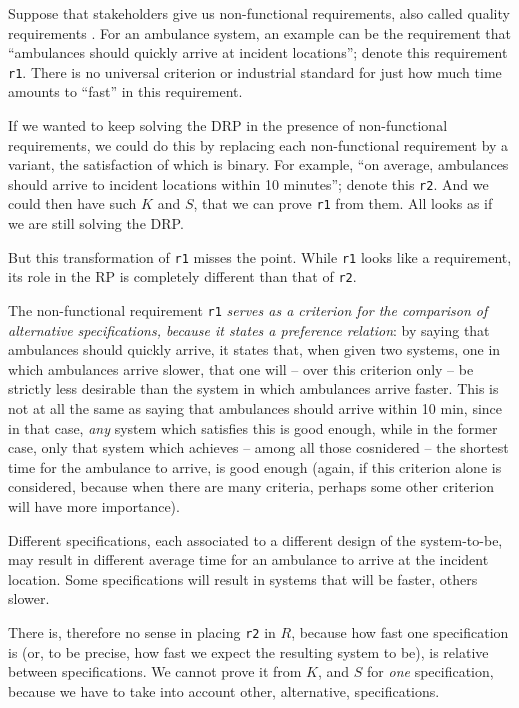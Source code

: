 \documentclass[graybox]{svmult}
\newcommand{\zi}[1]{\textit{#1}}
\newcommand{\xt}[1]{\texttt{#1}}
\newcommand{\req}[1]{\xt{#1}}
\newcommand{\RP}{RP}
\newcommand{\ZJRP}{DRP}
\begin{document}
Suppose that stakeholders give us non-functional requirements, also called quality requirements \cite{boehm1976quantitative, mylopoulos1992representing}. For an ambulance system, an example can be the requirement that ``ambulances should quickly arrive at incident locations''; denote this requirement \req{r1}. There is no universal criterion or industrial standard for just how much time amounts to ``fast'' in this requirement. 

If we wanted to keep solving the \ZJRP{} in the presence of non-functional requirements, we could do this by replacing each non-functional requirement by a variant, the satisfaction of which is binary. For example, ``on average, ambulances should arrive to incident locations within 10 minutes''; denote this \req{r2}. And we could then have such $K$ and $S$, that we can prove \req{r1} from them. All looks as if we are still solving the \ZJRP. 

But this transformation of \req{r1} misses the point. While \req{r1} looks like a requirement, its role in the \RP{} is completely different than that of \req{r2}. 

The non-functional requirement \req{r1} \zi{serves as a criterion for the comparison of alternative specifications, because it states a preference relation}: by saying that ambulances should quickly arrive, it states that, when given two systems, one in which ambulances arrive slower, that one will -- over this criterion only -- be strictly less desirable than the system in which ambulances arrive faster. This is not at all the same as saying that ambulances should arrive within 10 min, since in that case, \zi{any} system which satisfies this is good enough, while in the former case, only that system which achieves -- among all those cosnidered -- the shortest time for the ambulance to arrive, is good enough (again, if this criterion alone is considered, because when there are many criteria, perhaps some other criterion will have more importance).

Different specifications, each associated to a different design of the system-to-be, may result in different average time for an ambulance to arrive at the incident location. Some specifications will result in systems that will be faster, others slower. 

There is, therefore no sense in placing \req{r2} in $R$, because how fast one specification is (or, to be precise, how fast we expect the resulting system to be), is relative between specifications. We cannot prove it from $K$, and $S$ for \zi{one} specification, because we have to take into account other, alternative, specifications. 
\end{document}
